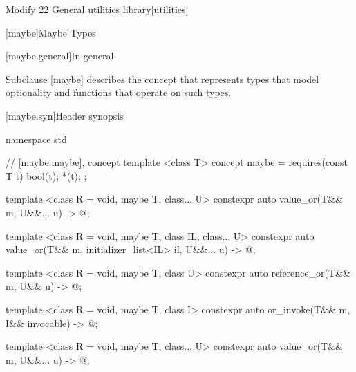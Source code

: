 Modify 22 General utilities library[utilities]


[maybe]{Maybe Types}
%

[maybe.general]{In general}

\pnum
Subclause \ref{maybe} describes the concept 
that represents types that model optionality and functions that operate on such types.

[maybe.syn]{Header  synopsis}

%
\begin{codeblock}
namespace std {
  // \ref{maybe.maybe}, concept 
template <class T>
concept maybe = requires(const T t) {
    bool(t);
    *(t);
  };

template <class R = void, maybe T, class... U>
    constexpr auto value_or(T&& m, U&&... u) -> @\seebelow@;

template <class R = void, maybe T, class IL, class... U>
    constexpr auto value_or(T&& m, initializer_list<IL> il, U&&... u) -> @\seebelow@;

template <class R = void, maybe T, class U>
    constexpr auto reference_or(T&& m, U&& u) -> @\seebelow@;

template <class R = void, maybe T, class I>
    constexpr auto or_invoke(T&& m, I&& invocable) -> @\seebelow@;

}
\end{codeblock}

%
\begin{itemdecl}
template <class R = void, maybe T, class... U>
    constexpr auto value_or(T&& m, U&&... u) -> @\seebelow@;
\end{itemdecl}


